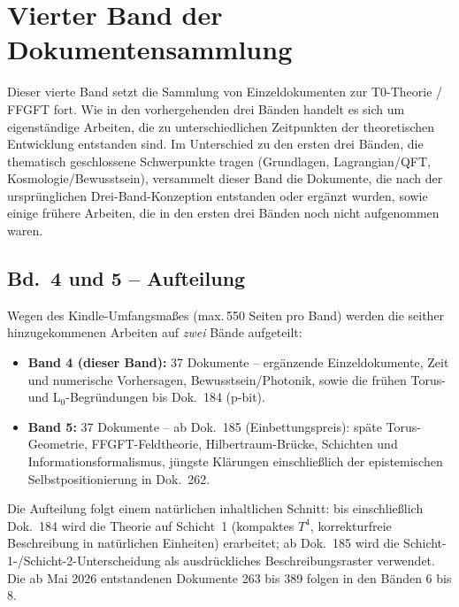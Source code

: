 
\section*{Vierter Band der Dokumentensammlung}

Dieser vierte Band setzt die Sammlung von Einzeldokumenten zur T0-Theorie /
FFGFT fort. Wie in den vorhergehenden drei Bänden handelt es sich um
eigenständige Arbeiten, die zu unterschiedlichen Zeitpunkten der theoretischen
Entwicklung entstanden sind. Im Unterschied zu den ersten drei Bänden, die
thematisch geschlossene Schwerpunkte tragen (Grundlagen, Lagrangian/QFT,
Kosmologie/Bewusstsein), versammelt dieser Band die Dokumente, die nach der
ursprünglichen Drei-Band-Konzeption entstanden oder ergänzt wurden, sowie
einige frühere Arbeiten, die in den ersten drei Bänden noch nicht aufgenommen
waren.

\subsection*{Bd.~4 und 5 -- Aufteilung}

Wegen des Kindle-Umfangsmaßes (max.\,550 Seiten pro Band) werden die seither
hinzugekommenen Arbeiten auf \emph{zwei} Bände aufgeteilt:

\begin{itemize}
\item \textbf{Band 4 (dieser Band):} 37 Dokumente -- ergänzende
      Einzeldokumente, Zeit und numerische Vorhersagen, Bewusstsein/Photonik,
      sowie die frühen Torus- und L$_0$-Begründungen bis Dok.~184 (p-bit).
\item \textbf{Band 5:} 37 Dokumente -- ab Dok.~185 (Einbettungspreis):
      späte Torus-Geometrie, FFGFT-Feldtheorie, Hilbertraum-Brücke,
      Schichten und Informationsformalismus, jüngste Klärungen
      einschließlich der epistemischen Selbstpositionierung in Dok.~262.
\end{itemize}

Die Aufteilung folgt einem natürlichen inhaltlichen Schnitt: bis einschließlich
Dok.~184 wird die Theorie auf Schicht~1 (kompaktes $T^4$, korrekturfreie
Beschreibung in natürlichen Einheiten) erarbeitet; ab Dok.~185 wird die
Schicht-1-/Schicht-2-Unterscheidung als ausdrückliches Beschreibungsraster
verwendet. Die ab Mai 2026 entstandenen Dokumente 263 bis 389 folgen in den
Bänden 6 bis 8.

